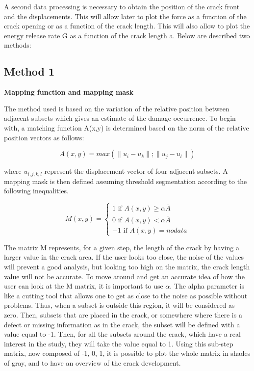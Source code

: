 A second data processing is necessary to obtain the position of the crack front and the displacements. This will allow later to plot the force as a function of the crack opening or as a function of the crack length. This will also allow to plot the energy release rate G as a function of the crack length a. Below are described two methods:

\subsection{Method 1}

\textbf{Mapping function and mapping mask}

The method used is based on the variation of the relative position between adjacent subsets which gives an estimate of the damage occurrence. To begin with, a matching function A(x,y) is determined based on the norm of the relative position vectors as follows:

\begin{equation}
	A(x,y)=max(\lVert u_i-u_k\rVert;\lVert u_j-u_l\rVert)
\end{equation}

where $u_{i,j,k,l}$ represent the displacement vector of four adjacent subsets. A mapping mask is then defined assuming threshold segmentation according to the following inequalities.

\begin{equation}
	M(x,y)=
	\begin{cases}
		1 \text{ if } A(x,y) \geq \alpha \overline{A} \\
		0 \text{ if } A(x,y)< \alpha \overline{A}\\
		-1 \text{ if } A(x,y)= no data 
	\end{cases}
\end{equation}

The matrix M represents, for a given step, the length of the crack by having a larger value in the crack area. If the user looks too close, the noise of the values will prevent a good analysis, but looking too high on the matrix, the crack length value will not be accurate. To move around and get an accurate idea of how the user can look at the M matrix, it is important to use $\alpha$. The alpha parameter is like a cutting tool that allows one to get as close to the noise as possible without problems. Thus, when a subset is outside this region, it will be considered as zero. Then, subsets that are placed in the crack, or somewhere where there is a defect or missing information as in the crack, the subset will be defined with a value equal to -1. Then, for all the subsets around the crack, which have a real interest in the study, they will take the value equal to 1. Using this sub-step matrix, now composed of -1, 0, 1, it is possible to plot the whole matrix in shades of gray, and to have an overview of the crack development.

